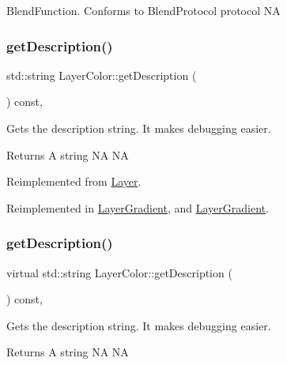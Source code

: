 Blend\+Function. Conforms to Blend\+Protocol protocol  NA \mbox{\label{classLayerColor_aae6932d9d9e0ae21cc34e1e37d0b2d92}} 
\subsubsection{\texorpdfstring{get\+Description()}{getDescription()}\hspace{0.1cm}{\footnotesize\ttfamily [1/2]}}
{\footnotesize\ttfamily std\+::string Layer\+Color\+::get\+Description (\begin{DoxyParamCaption}{ }\end{DoxyParamCaption}) const\hspace{0.3cm}{\ttfamily [override]}, {\ttfamily [virtual]}}

Gets the description string. It makes debugging easier. \begin{DoxyReturn}{Returns}
A string  NA  NA 
\end{DoxyReturn}


Reimplemented from \hyperlink{classLayer_acadcdf383e0bf892c95213a4f7725672}{Layer}.



Reimplemented in \hyperlink{classLayerGradient_ace9ed0ed0422bdc89a7e440a9f8307d3}{Layer\+Gradient}, and \hyperlink{classLayerGradient_a95a281f25e6c4196664e9866e451fcc2}{Layer\+Gradient}.

\mbox{\label{classLayerColor_a363da7455314bdf8a5fd4f809e70796e}} 
\subsubsection{\texorpdfstring{get\+Description()}{getDescription()}\hspace{0.1cm}{\footnotesize\ttfamily [2/2]}}
{\footnotesize\ttfamily virtual std\+::string Layer\+Color\+::get\+Description (\begin{DoxyParamCaption}{ }\end{DoxyParamCaption}) const\hspace{0.3cm}{\ttfamily [override]}, {\ttfamily [virtual]}}

Gets the description string. It makes debugging easier. \begin{DoxyReturn}{Returns}
A string  NA  NA 
\end{DoxyReturn}


